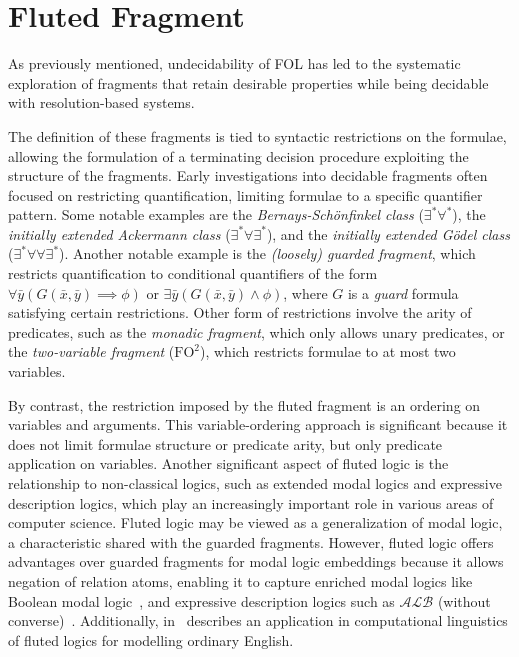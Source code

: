 \chapter{Fluted Fragment}\label{chap:fluted-fragment}

As previously mentioned, undecidability of FOL has led to the systematic exploration of fragments that retain desirable properties while being decidable with resolution-based systems.

The definition of these fragments is tied to syntactic restrictions on the formulae, allowing the formulation of a terminating decision procedure exploiting the structure of the fragments.
Early investigations into decidable fragments often focused on restricting quantification, limiting formulae to a specific quantifier pattern.
Some notable examples are the \emph{Bernays-Schönfinkel class} (\(\exists^*\forall^*\)), the \emph{initially extended Ackermann class} (\(\exists^*\forall\exists^*\)), and the \emph{initially extended Gödel class} (\(\exists^*\forall\forall\exists^*\)).
Another notable example is the \emph{(loosely) guarded fragment}, which restricts quantification to conditional quantifiers of the form \(\forall \bar{y} (G(\bar{x},\bar{y}) \implies \phi)\) or \(\exists \bar{y} (G(\bar{x},\bar{y}) \land \phi)\), where \(G\) is a \emph{guard} formula satisfying certain restrictions.
Other form of restrictions involve the arity of predicates, such as the \emph{monadic fragment}, which only allows unary predicates, or the \emph{two-variable fragment} (\(\text{FO}^2\)), which restricts formulae to at most two variables.

By contrast, the restriction imposed by the fluted fragment is an ordering on variables and arguments.
This variable-ordering approach is significant because it does not limit formulae structure or predicate arity, but only predicate application on variables.
Another significant aspect of fluted logic is the relationship to non-classical logics, such as extended modal logics and expressive description logics, which play an increasingly important role in various areas of computer science.
Fluted logic may be viewed as a generalization of modal logic, a characteristic shared with the guarded fragments. 
However, fluted logic offers advantages over guarded fragments for modal logic embeddings because it allows negation of relation atoms, enabling it to capture enriched modal logics like Boolean modal logic~\cite{gargov1990boolean}, and expressive description logics such as \(\mathcal{ALB}\) (without converse)~\cite{hustadt2000issues}.
Additionally, in~\cite{purdy1999quine} \citeauthor{purdy1999quine} describes an application in computational linguistics of fluted logics for
modelling ordinary English.

